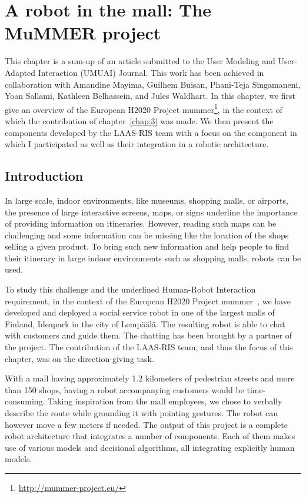 \ifdefined{}
\else
\setcounter{chapter}{8} %
\dominitoc
\faketableofcontents
\fi

\chapter{A robot in the mall: The MuMMER project}
\minitoc

This chapter is a sum-up of an article submitted to the  User Modeling and User-Adapted Interaction (UMUAI) Journal. This work has been achieved in collaboration with Amandine Mayima, Guilhem Buisan, Phani-Teja Singamaneni, Yoan Sallami, Kathleen Belhassein, and Jules Waldhart. In this chapter, we first give an overview of the European H2020 Project \acrfull{mummer}\footnote{\url{http://mummer-project.eu/}}, in the context of which the contribution of chapter~\ref{chap:3} was made. We then present the components developed by the LAAS-RIS team with a focus on the component in which I participated as well as their integration in a robotic architecture.

\section{Introduction}

In large scale, indoor environments, like museums, shopping malls, or airports, the presence of large interactive screens, maps, or signs underline the importance of providing information on itineraries. However, reading such maps can be challenging and some information can be missing like the location of the shops selling a given product. To bring such new information and help people to find their itinerary in large indoor environments such as shopping malls, robots can be used.

To study this challenge and the underlined Human-Robot Interaction requirement, in the context of the European H2020 Project \acrshort{mummer}~\cite{foster_2016_mummer}, we have developed and deployed a social service robot in one of the largest malls of Finland, Ideapark in the city of Lemp\"a\"al\"a. The resulting robot is able to chat with customers and guide them. The chatting has been brought by a partner of the project. The contribution of the LAAS-RIS team, and thus the focus of this chapter, was on the direction-giving task.

With a mall having approximately 1.2 kilometers of pedestrian streets and more than 150 shops, having a robot accompanying customers would be time-consuming. Taking inspiration from the mall employees, we chose to verbally describe the route while grounding it with pointing gestures. The robot can however move a few meters if needed. %
The output of this project is a complete robot architecture that integrates a number of components. Each of them makes use of various models and decisional algorithms, all integrating explicitly human models.

